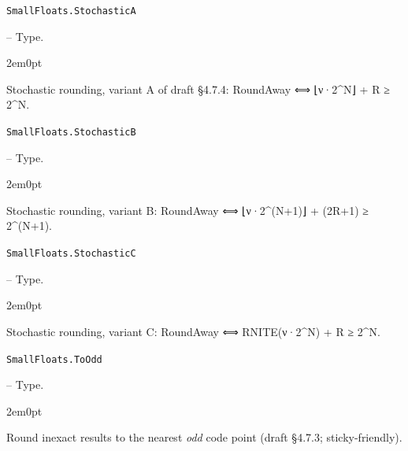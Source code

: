 \par\medskip\noindent\begin{minipage}{\linewidth}
\hypertarget{8332080681071361269}{\texttt{SmallFloats.StochasticA}}  -- {Type.}
\nopagebreak
\begin{adjustwidth}{2em}{0pt}

Stochastic rounding, variant A of draft §4.7.4: RoundAway ⟺ ⌊ν·2{\textasciicircum}N⌋ + R ≥ 2{\textasciicircum}N.



\end{adjustwidth}
\end{minipage}
\par\medskip

\par\medskip\noindent\begin{minipage}{\linewidth}
\hypertarget{7252621162593156278}{\texttt{SmallFloats.StochasticB}}  -- {Type.}
\nopagebreak
\begin{adjustwidth}{2em}{0pt}

Stochastic rounding, variant B: RoundAway ⟺ ⌊ν·2{\textasciicircum}(N+1)⌋ + (2R+1) ≥ 2{\textasciicircum}(N+1).



\end{adjustwidth}
\end{minipage}
\par\medskip

\par\medskip\noindent\begin{minipage}{\linewidth}
\hypertarget{11628007139636489123}{\texttt{SmallFloats.StochasticC}}  -- {Type.}
\nopagebreak
\begin{adjustwidth}{2em}{0pt}

Stochastic rounding, variant C: RoundAway ⟺ RNITE(ν·2{\textasciicircum}N) + R ≥ 2{\textasciicircum}N.



\end{adjustwidth}
\end{minipage}
\par\medskip

\par\medskip\noindent\begin{minipage}{\linewidth}
\hypertarget{18226116418678579012}{\texttt{SmallFloats.ToOdd}}  -- {Type.}
\nopagebreak
\begin{adjustwidth}{2em}{0pt}

Round inexact results to the nearest \emph{odd} code point (draft §4.7.3; sticky-friendly).



\end{adjustwidth}
\end{minipage}
\par\medskip

